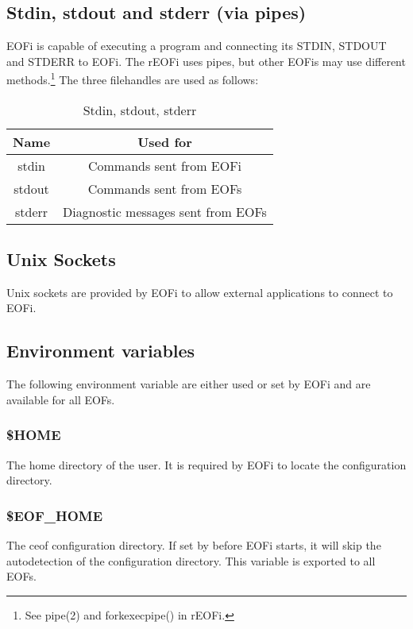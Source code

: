 \documentclass[12pt,a4paper]{book}
\begin{document}
\subsection{Stdin, stdout and stderr (via pipes)}
EOFi is capable of executing a program and connecting its STDIN, STDOUT and
STDERR to EOFi. The rEOFi uses pipes, but other EOFis may use different
methods.\footnote{See pipe(2) and forkexecpipe() in rEOFi.}
The three filehandles are used as follows:
\begin{longtable}{|c|c|}
\caption{Stdin, stdout, stderr}\\
\hline
\textbf{Name} & \textbf{Used for}\\
\hline
stdin & Commands sent from EOFi\\
\hline
stdout & Commands sent from EOFs\\
\hline
stderr & Diagnostic messages sent from EOFs\\
\hline
\end{longtable}
\subsection{Unix Sockets}
Unix sockets are provided by EOFi to allow external applications to
connect to EOFi.
\subsection{Environment variables}
The following environment variable are either used or set by EOFi and are
available for all EOFs.
\subsubsection{\$HOME}
The home directory of the user. It is required by EOFi to locate the
configuration directory.
\subsubsection{\$EOF\_HOME}
The ceof configuration directory. If set by before EOFi starts, it will
skip the autodetection of the configuration directory.
This variable is exported to all EOFs.
\end{document}
